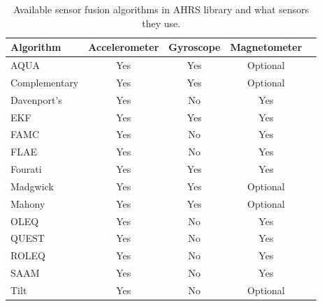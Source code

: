 \begin{table}
    \begin{center}
        \begin{tabular}[t]{lcccc}
            \hline
            Algorithm     & Accelerometer & Gyroscope & Magnetometer \\
            \hline
            AQUA          & Yes           & Yes       & Optional     \\
            Complementary & Yes           & Yes       & Optional     \\
            Davenport's   & Yes           & No        & Yes          \\
            EKF           & Yes           & Yes       & Yes          \\
            FAMC          & Yes           & No        & Yes          \\
            FLAE          & Yes           & No        & Yes          \\
            Fourati       & Yes           & Yes       & Yes          \\
            Madgwick      & Yes           & Yes       & Optional     \\
            Mahony        & Yes           & Yes       & Optional     \\
            OLEQ          & Yes           & No        & Yes          \\
            QUEST         & Yes           & No        & Yes          \\
            ROLEQ         & Yes           & No        & Yes          \\
            SAAM          & Yes           & No        & Yes          \\
            Tilt          & Yes           & No        & Optional     \\
            \hline
        \end{tabular}
        \caption{Available sensor fusion algorithms in AHRS library and what sensors they use. \cite{ahrs}}
        \label{tab:ahrs_algorithms}
    \end{center}
\end{table}

